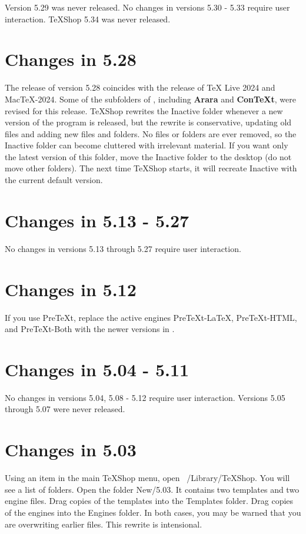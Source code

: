 \documentclass[11pt, oneside]{amsart}
\begin{document}
Version 5.29 was never released. No changes in versions 5.30 - 5.33 require user interaction. TeXShop 5.34 was never released.


\section{Changes in 5.28}

The release of version 5.28 coincides with the release of TeX Live 2024 and MacTeX-2024. Some of the subfolders of 
, including {\bf Arara} and {\bf ConTeXt}, were revised for this release.
TeXShop rewrites the Inactive folder whenever a new version of the program is released, but the rewrite is  conservative, updating old files and adding new files and folders. No files or folders are ever removed, so the Inactive folder can become cluttered with  irrelevant material. If you want only the latest version of this folder, move the Inactive folder to the desktop (do not move other folders). The next time TeXShop starts, it will recreate Inactive with the current default version.

\section{Changes in 5.13 - 5.27}

No changes in versions 5.13 through 5.27 require user interaction.


\section{Changes in 5.12}

If you use PreTeXt, replace the active engines PreTeXt-LaTeX, PreTeXt-HTML, and PreTeXt-Both with the newer versions in .  

\section{Changes in 5.04 - 5.11}

No changes in versions 5.04, 5.08 - 5.12 require user interaction. Versions 5.05 through 5.07 were never released.

\section{Changes in 5.03}
Using an item in the main TeXShop menu, open ~/Library/TeXShop. You will see a list of folders. Open the folder New/5.03. It contains two templates and two engine files. Drag copies of the templates into the Templates folder. Drag copies of the engines into the Engines folder.  In both cases, you may be warned that you are overwriting earlier files. This rewrite is intensional. 
\end{document}
